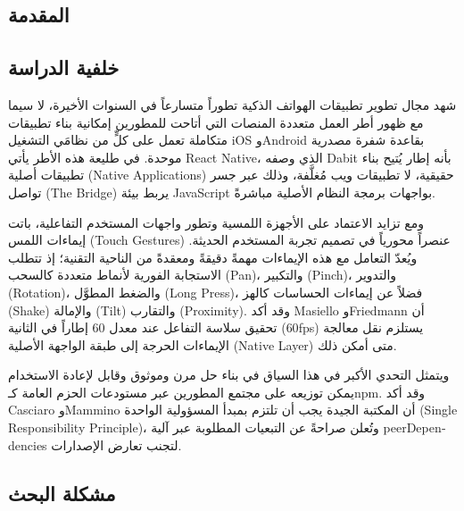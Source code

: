 \begin{Arabic}
\chapter{المقدمة}
\clearpage

\section{خلفية الدراسة}

شهد مجال تطوير تطبيقات الهواتف الذكية تطوراً متسارعاً في السنوات الأخيرة، لا سيما مع ظهور أطر العمل متعددة المنصات التي أتاحت للمطورين إمكانية بناء تطبيقات متكاملة تعمل على كلٍّ من نظامَي التشغيل \textenglish{iOS} و\textenglish{Android} بقاعدة شفرة مصدرية موحدة. في طليعة هذه الأطر يأتي \textenglish{React Native}، الذي وصفه \textenglish{Dabit} \cite{dabit2019} بأنه إطار يُتيح بناء تطبيقات أصلية (\textenglish{Native Applications}) حقيقية، لا تطبيقات ويب مُغلَّفة، وذلك عبر جسر تواصل (\textenglish{The Bridge}) يربط بيئة \textenglish{JavaScript} بواجهات برمجة النظام الأصلية مباشرةً.

ومع تزايد الاعتماد على الأجهزة اللمسية وتطور واجهات المستخدم التفاعلية، باتت إيماءات اللمس (\textenglish{Touch Gestures}) عنصراً محورياً في تصميم تجربة المستخدم الحديثة. ويُعدّ التعامل مع هذه الإيماءات مهمةً دقيقةً ومعقدةً من الناحية التقنية؛ إذ تتطلب الاستجابة الفورية لأنماط متعددة كالسحب (\textenglish{Pan})، والتكبير (\textenglish{Pinch})، والتدوير (\textenglish{Rotation})، والضغط المطوَّل (\textenglish{Long Press})، فضلاً عن إيماءات الحساسات كالهز (\textenglish{Shake}) والإمالة (\textenglish{Tilt}) والتقارب (\textenglish{Proximity}). وقد أكد \textenglish{Masiello} و\textenglish{Friedmann} \cite{masiello2017} أن تحقيق سلاسة التفاعل عند معدل 60 إطاراً في الثانية (\textenglish{60fps}) يستلزم نقل معالجة الإيماءات الحرجة إلى طبقة الواجهة الأصلية (\textenglish{Native Layer}) متى أمكن ذلك.

ويتمثل التحدي الأكبر في هذا السياق في بناء حل مرن وموثوق وقابل لإعادة الاستخدام يمكن توزيعه على مجتمع المطورين عبر مستودعات الحزم العامة كـ\textenglish{npm}. وقد أكد \textenglish{Casciaro} و\textenglish{Mammino} \cite{casciaro2020} أن المكتبة الجيدة يجب أن تلتزم بمبدأ المسؤولية الواحدة (\textenglish{Single Responsibility Principle})، وتُعلن صراحةً عن التبعيات المطلوبة عبر آلية \textenglish{peerDependencies} لتجنب تعارض الإصدارات.

\section{مشكلة البحث}


\end{Arabic}
